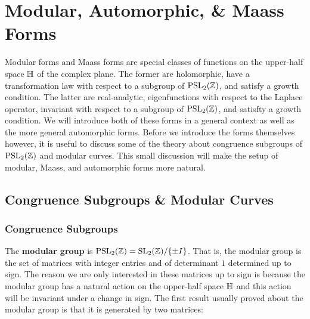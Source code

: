 \chapter{Modular, Automorphic, \& Maass Forms}\label{ch:Modular_Maass_Automorphic_forms}
  Modular forms and Maass forms are special classes of functions on the upper-half space $\mathbb{H}$ of the complex plane. The former are holomorphic, have a transformation law with respect to a subgroup of $\mathrm{PSL}_{2}(\mathbb{Z})$, and satisfy a growth condition. The latter are real-analytic, eigenfunctions with respect to the Laplace operator, invariant with respect to a subgroup of $\mathrm{PSL}_{2}(\mathbb{Z})$, and satisfty a growth condition. We will introduce both of these forms in a general context as well as the more general automorphic forms. Before we introduce the forms themselves however, it is useful to discuss some of the theory about congruence subgroups of $\mathrm{PSL}_{2}(\mathbb{Z})$ and modular curves. This small discussion will make the setup of modular, Maass, and automorphic forms more natural.
  \section{Congruence Subgroups \& Modular Curves}
    \subsection*{Congruence Subgroups}
      The \textbf{modular group} is $\mathrm{PSL}_{2}(\mathbb{Z}) = \mathrm{SL}_{2}(\mathbb{Z})/\{\pm I\}$. That is, the modular group is the set of matrices with integer entries and of determinant $1$ determined up to sign. The reason we are only interested in these matrices up to sign is because the modular group has a natural action on the upper-half space $\mathbb{H}$ and this action will be invariant under a change in sign. The first result usually proved about the modular group is that it is generated by two matrices:

